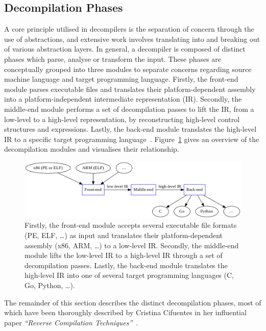 
\subsection{Decompilation Phases}
\label{sec:lit_review_decompilation_phases}

A core principle utilised in decompilers is the separation of concern through the use of abstractions, and extensive work involves translating into and breaking out of various abstraction layers. In general, a decompiler is composed of distinct phases which parse, analyse or transform the input. These phases are conceptually grouped into three modules to separate concerns regarding source machine language and target programming language. Firstly, the front-end module parses executable files and translates their platform-dependent assembly into a platform-independent intermediate representation (IR). Secondly, the middle-end module performs a set of decompilation passes to lift the IR, from a low-level to a high-level representation, by reconstructing high-level control structures and expressions. Lastly, the back-end module translates the high-level IR to a specific target programming language~\cite{reverse_comp}. Figure~\ref{fig:modules_overview} gives an overview of the decompilation modules and visualises their relationship.

\begin{figure}[htbp]
	\begin{center}
		\includegraphics[width=\textwidth]{inc/2_lit_review/modules_overview.png}
		\caption{Firstly, the front-end module accepts several executable file formats (PE, ELF, …) as input and translates their platform-dependent assembly (x86, ARM, …) to a low-level IR. Secondly, the middle-end module lifts the low-level IR to a high-level IR through a set of decompilation passes. Lastly, the back-end module translates the high-level IR into one of several target programming languages (C, Go, Python, …).}
		\label{fig:modules_overview}
	\end{center}
\end{figure}

The remainder of this section describes the distinct decompilation phases, most of which have been thoroughly described by Cristina Cifuentes in her influential paper \textit{``Reverse Compilation Techniques''}~\cite{reverse_comp}.





